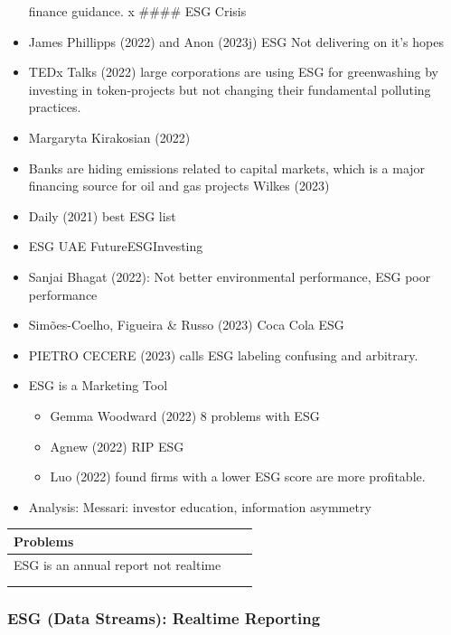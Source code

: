 \documentclass[
  letterpaper,
  DIV=11,
  numbers=noendperiod]{scrartcl}
\providecommand{\tightlist}{%
  \setlength{\itemsep}{0pt}\setlength{\parskip}{0pt}}\usepackage{longtable,booktabs,array}
\begin{document}
\begin{itemize}
  finance guidance. x \#\#\#\# ESG Crisis
\item
  James Phillipps (2022) and Anon (2023j) ESG Not delivering on it's
  hopes
\item
  TEDx Talks (2022) large corporations are using ESG for greenwashing by
  investing in token-projects but not changing their fundamental
  polluting practices.
\item
  Margaryta Kirakosian (2022)
\item
  Banks are hiding emissions related to capital markets, which is a
  major financing source for oil and gas projects Wilkes (2023)
\item
  Daily (2021) best ESG list
\item
  ESG UAE FutureESGInvesting
\item
  Sanjai Bhagat (2022): Not better environmental performance, ESG poor
  performance
\item
  Simões-Coelho, Figueira \& Russo (2023) Coca Cola ESG
\item
  PIETRO CECERE (2023) calls ESG labeling confusing and arbitrary.
\item
  ESG is a Marketing Tool

  \begin{itemize}
  \tightlist
  \item
    Gemma Woodward (2022) 8 problems with ESG
  \item
    Agnew (2022) RIP ESG
  \item
    Luo (2022) found firms with a lower ESG score are more profitable.
  \end{itemize}
\item
  Analysis: Messari: investor education, information asymmetry
\end{itemize}

\begin{longtable}[]{@{}lll@{}}
\toprule\noalign{}
Problems & & \\
\midrule\noalign{}
\endhead
\bottomrule\noalign{}
\endlastfoot
ESG is an annual report not realtime & & \\
& & \\
& & \\
\end{longtable}

\subsubsection{ESG (Data Streams): Realtime
Reporting}\label{esg-data-streams-realtime-reporting}
\end{document}
